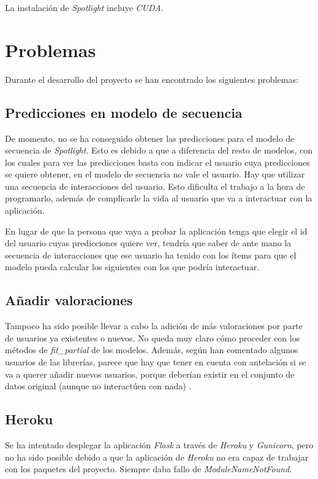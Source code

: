 La instalación de \textit{Spotlight} incluye \textit{CUDA}.

\section{Problemas}\label{problemas}
Durante el desarrollo del proyecto se han encontrado los siguientes problemas:

\subsection{Predicciones en modelo de secuencia}\label{predicciones-secuencia}
De momento, no se ha conseguido obtener las predicciones para el modelo de secuencia de \textit{Spotlight}. Esto es debido a que a diferencia del resto de modelos, con los cuales para ver las predicciones basta con indicar el usuario cuya predicciones se quiere obtener, en el modelo de secuencia no vale el usuario. Hay que utilizar una secuencia de interacciones del usuario. Esto dificulta el trabajo a la hora de programarlo, además de complicarle la vida al usuario que va a interactuar con la aplicación.

En lugar de que la persona que vaya a probar la aplicación tenga que elegir el id del usuario cuyas predicciones quiere ver, tendría que saber de ante mano la secuencia de interacciones que ese usuario ha tenido con los ítems para que el modelo pueda calcular los siguientes con los que podría interactuar.

\subsection{Añadir valoraciones}\label{mas-valoraciones}
Tampoco ha sido posible llevar a cabo la adición de más valoraciones por parte de usuarios ya existentes o nuevos. No queda muy claro cómo proceder con los métodos de \textit{fit\_partial} de los modelos. Además, según han comentado algunos usuarios de las librerías, parece que hay que tener en cuenta con antelación si se va a querer añadir nuevos usuarios, porque deberían existir en el conjunto de datos original (aunque no interactúen con nada) \cite{problema-mas-valoraciones}.

\subsection{Heroku}\label{heroku}
Se ha intentado desplegar la aplicación \textit{Flask} a través de \textit{Heroku} y \textit{Gunicorn}, pero no ha sido posible debido a que la aplicación de \textit{Heroku} no era capaz de trabajar con los paquetes del proyecto. Siempre daba fallo de \textit{ModuleNameNotFound}.

